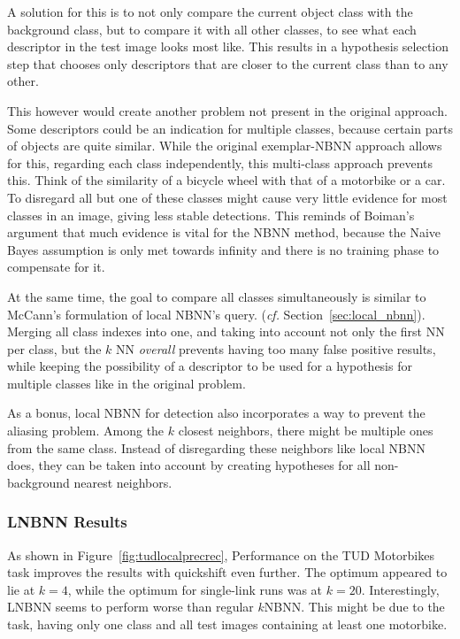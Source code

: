 A solution for this is to not only compare the current object class with the background class, but to compare it with all other classes, to see what each descriptor in the test image looks most like. This results in a hypothesis selection step that chooses only descriptors that are closer to the current class than to any other.

This however would create another problem not present in the original approach. Some descriptors could be an indication for multiple classes, because certain parts of objects are quite similar. While the original exemplar-NBNN approach allows for this, regarding each class independently, this multi-class approach prevents this. Think of the similarity of a bicycle wheel with that of a motorbike or a car. To disregard all but one of these classes might cause very little evidence for most classes in an image, giving less stable detections. This reminds of Boiman's argument that much evidence is vital for the NBNN method, because the Naive Bayes assumption is only met towards infinity and there is no training phase to compensate for it.\cite{boiman2008defense}

At the same time, the goal to compare all classes simultaneously is similar to McCann's formulation of local NBNN's query.\cite{mccann2012local} (\emph{cf.} Section~\ref{sec:local_nbnn}). Merging all class indexes into one, and taking into account not only the first NN per class, but the $k$ NN \emph{overall} prevents having too many false positive results, while keeping the possibility of a descriptor to be used for a hypothesis for multiple classes like in the original problem.

As a bonus, local NBNN for detection also incorporates a way to prevent the aliasing problem. Among the $k$ closest neighbors, there might be multiple ones from the same class. Instead of disregarding these neighbors like local NBNN does, they can be taken into account by creating hypotheses for all non-background nearest neighbors.


\subsubsection{LNBNN Results} %
\label{ssub:lnbnn_results}

As shown in Figure~\ref{fig:tudlocalprecrec}, Performance on the TUD Motorbikes task improves the results with quickshift even further. The optimum appeared to lie at $k=4$, while the optimum for single-link runs was at $k=20$. Interestingly, LNBNN seems to perform worse than regular $k$NBNN. This might be due to the task, having only one class and all test images containing at least one motorbike.


